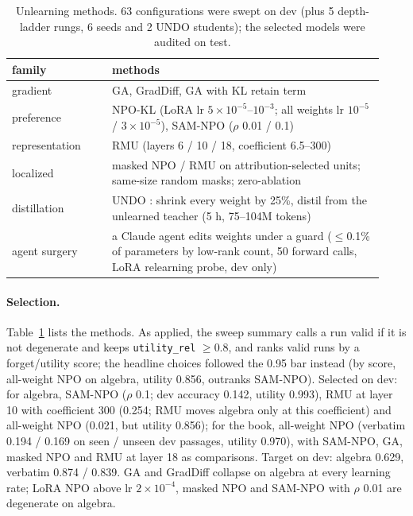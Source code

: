 \documentclass[10pt,twocolumn,letterpaper]{article}
\begin{document}
\begin{table}[t]
\centering\small
\caption{Unlearning methods. 63 configurations were swept on dev (plus 5 depth-ladder rungs, 6 seeds and 2 UNDO
students); the selected models were audited on test.}
\label{tab:methods}
\begin{tabular}{@{}p{0.25\linewidth}p{0.68\linewidth}@{}}
\toprule
family & methods \\
\midrule
gradient & GA, GradDiff, GA with KL retain term \\
preference & NPO-KL (LoRA lr $5\times10^{-5}$--$10^{-3}$; all weights lr $10^{-5}$ / $3\times10^{-5}$), SAM-NPO
\cite{fan2025sam} ($\rho$ 0.01 / 0.1) \\
representation & RMU \cite{li2024wmdp} (layers 6 / 10 / 18, coefficient 6.5--300) \\
localized & masked NPO / RMU on attribution-selected units; same-size random masks; zero-ablation \\
distillation & UNDO \cite{lee2025undo}: shrink every weight by 25\%, distil from the unlearned teacher (5 h, 75--104M
tokens) \\
agent surgery & a Claude agent edits weights under a guard ($\le$0.1\% of parameters by low-rank count, 50 forward calls,
LoRA relearning probe, dev only) \\
\bottomrule
\end{tabular}
\end{table}

\paragraph{Selection.} Table~\ref{tab:methods} lists the methods. As applied, the sweep summary calls a run valid if it is
not degenerate and keeps \texttt{utility\_rel} $\ge$0.8, and ranks valid runs by a forget/utility score; the headline
choices followed the 0.95 bar instead (by score, all-weight NPO on algebra, utility 0.856, outranks SAM-NPO). Selected on
dev: for algebra, SAM-NPO ($\rho$ 0.1; dev accuracy 0.142, utility 0.993), RMU at layer 10 with coefficient 300 (0.254;
RMU moves algebra only at this coefficient) and all-weight NPO (0.021, but utility 0.856); for the book, all-weight NPO
(verbatim 0.194 / 0.169 on seen / unseen dev passages, utility 0.970), with SAM-NPO, GA, masked NPO and RMU at layer 18 as
comparisons. Target on dev: algebra 0.629, verbatim 0.874 / 0.839. GA and GradDiff collapse on algebra at every learning
rate; LoRA NPO above lr $2\times10^{-4}$, masked NPO and SAM-NPO with $\rho$ 0.01 are degenerate on algebra.
\end{document}
